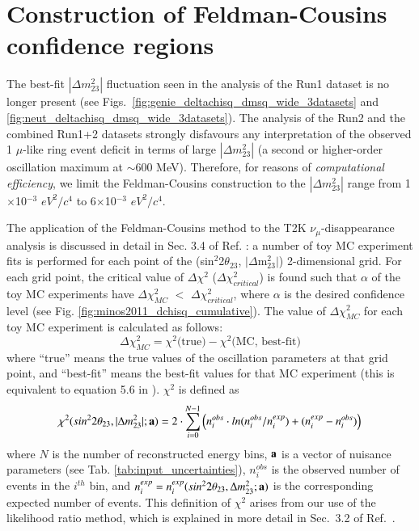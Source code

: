 \clearpage 

\section {Construction of Feldman-Cousins confidence regions}
\label{sec:fc}

The best-fit $|\Delta m^{2}_{23}|$ fluctuation seen in the analysis of the Run1 dataset is no longer present
(see Figs.\ \ref{fig:genie_deltachisq_dmsq_wide_3datasets} and \ref{fig:neut_deltachisq_dmsq_wide_3datasets}).
The analysis of the Run2 and the combined Run1+2 datasets strongly disfavours any interpretation of the 
observed 1 $\mu$-like ring event deficit in terms of large $|\Delta m^{2}_{23}|$ (a second or higher-order oscillation maximum 
at $\sim$600 MeV). Therefore, for reasons of {\em computational efficiency}, we limit the Feldman-Cousins
construction to the $|\Delta m^{2}_{23}|$ range from 1$\times$10$^{-3}$ $eV^{2}/c^{4}$ to 6$\times$10$^{-3}$ $eV^{2}/c^{4}$.

The application of the Feldman-Cousins method \cite{FeldmanCousins} to the T2K $\nu_{\mu}$-disappearance analysis
is discussed in detail in Sec. 3.4 of Ref. \cite{OurRun1DisappAnalysis}:
a number of toy MC experiment fits is performed for each point of the (sin$^{2}$2$\theta_{23}$, $|\Delta$m$^{2}_{23}|$)
2-dimensional grid.
For each grid point, the critical value of $\Delta\chi^{2}$ ($\Delta\chi^{2}_{critical}$)
is found such that $\alpha$ of the toy MC experiments have $\Delta\chi^{2}_{MC}$ $<$ $\Delta\chi^{2}_{critical}$,
where $\alpha$ is the desired confidence level (see Fig. \ref{fig:minos2011_dchisq_cumulative}).
The value of $\Delta\chi^{2}_{MC}$ for each toy MC experiment is calculated as follows:
\begin{equation}
\displaystyle
\Delta \chi^{2}_{MC} = \chi^{2} \textrm{(true)} - \chi^{2} \textrm{(MC, best-fit)}
\label{eq:deltachi2}
\end{equation}
where
``true'' means the true values of the oscillation parameters at that grid point, and
``best-fit'' means the best-fit values for that MC experiment (this is equivalent to 
equation 5.6 in \cite{FeldmanCousins}).
$\chi^{2}$ is defined as
\begin{equation}
\displaystyle
\chi^{2} (sin^{2}2\theta_{23},|\Delta m^{2}_{23}|;{\bf a}) =
  2 \cdot \sum_{i=0}^{N-1}
   \Big(
     n^{obs}_{i} \cdot ln(n^{obs}_{i}/n^{exp}_{i}) +
     (n^{exp}_{i}-n^{obs}_{i})
   \Big) 
\label{eq:chisquare}
\end{equation}
where
$N$ is the number of reconstructed energy bins,
${\bf a}$ is a vector of nuisance parameters (see Tab. \ref{tab:input_uncertainties}),
$n^{obs}_{i}$ is the observed number of events in the $i^{th}$ bin, and
$n^{exp}_{i} = n^{exp}_{i}(sin^{2}2\theta_{23},\Delta m^{2}_{23}; {\bf a})$
is the corresponding expected number of events. This definition of $\chi^{2}$ arises from our use
of the likelihood ratio method, which is explained in more detail in 
Sec.\ 3.2 of Ref.\ \cite{OurRun1DisappAnalysis}.

